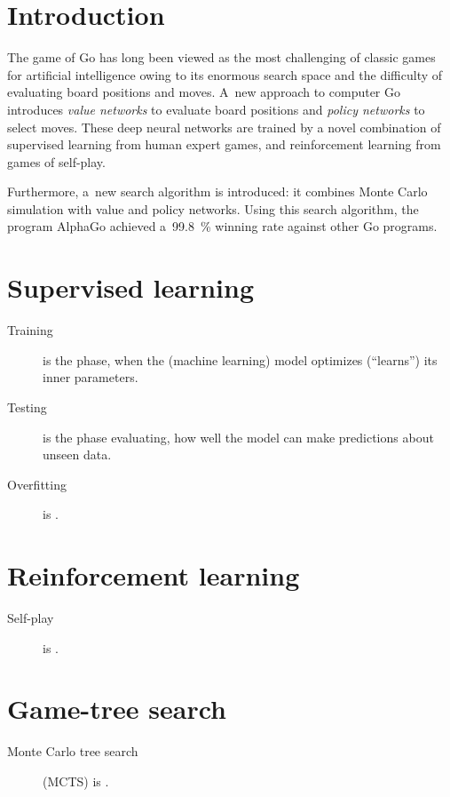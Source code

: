 \documentclass[a4paper,10pt]{article}
\begin{document}

\section{Introduction}
The game of Go has long been viewed as the most challenging of classic games for artificial intelligence owing to its enormous search space and the difficulty of evaluating board positions and moves.
A~new approach to computer Go introduces \emph{value networks} to evaluate board positions and \emph{policy networks} to select moves.
These deep neural networks are trained by a novel combination of supervised learning from human expert games, and reinforcement learning from games of self-play.

Furthermore, a~new search algorithm is introduced: it combines Monte Carlo simulation with value and policy networks.
Using this search algorithm, the program AlphaGo achieved a~99.8~\% winning rate against other Go programs.

\section{Supervised learning}
\begin{description}
  \item [Training] is the phase, when the (machine learning) model optimizes (``learns'') its inner parameters.
  \item [Testing] is the phase evaluating, how well the model can make predictions about unseen data.
  \item [Overfitting] is \todo.
\end{description}

\section{Reinforcement learning}
\begin{description}
  \item [Self-play] is \todo.
\end{description}

\section{Game-tree search}
\begin{description}
  \item [Monte Carlo tree search] (MCTS) is \todo.
\end{description}
\end{document}
